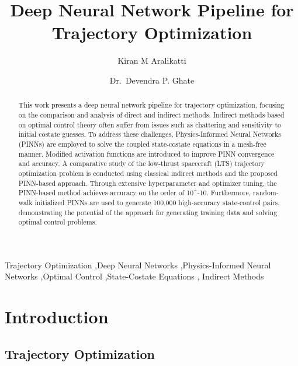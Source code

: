 \documentclass[
  number,
  preprint]{elsarticle}
\begin{document}
\begin{frontmatter}
\title{Deep Neural Network Pipeline for Trajectory Optimization}
\author[1]{Kiran M Aralikatti%
%
}
\author[1]{Dr.~Devendra P. Ghate%
%
}




        
\begin{abstract}
This work presents a deep neural network pipeline for trajectory
optimization, focusing on the comparison and analysis of direct and
indirect methods. Indirect methods based on optimal control theory often
suffer from issues such as chattering and sensitivity to initial costate
guesses. To address these challenges, Physics-Informed Neural Networks
(PINNs) are employed to solve the coupled state-costate equations in a
mesh-free manner. Modified activation functions are introduced to
improve PINN convergence and accuracy. A comparative study of the
low-thrust spacecraft (LTS) trajectory optimization problem is conducted
using classical indirect methods and the proposed PINN-based approach.
Through extensive hyperparameter and optimizer tuning, the PINN-based
method achieves accuracy on the order of 10\^{}-10. Furthermore,
random-walk initialized PINNs are used to generate 100,000 high-accuracy
state-control pairs, demonstrating the potential of the approach for
generating training data and solving optimal control problems.
\end{abstract}





\begin{keyword}
    Trajectory Optimization \sep Deep Neural
Networks \sep Physics-Informed Neural Networks \sep Optimal
Control \sep State-Costate Equations \sep 
    Indirect Methods
\end{keyword}
\end{frontmatter}
    

\section{Introduction}\label{introduction}

\subsection{Trajectory Optimization}\label{trajectory-optimization}
\end{document}
